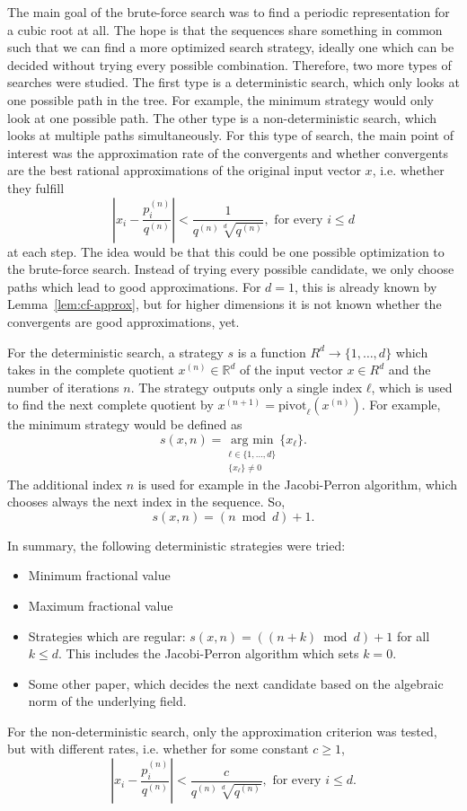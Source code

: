 The main goal of the brute-force search was to find a periodic representation for a cubic root at all.
The hope is that the sequences share something in common such that we can find
a more optimized search strategy, ideally one which can be decided without
trying every possible combination.
Therefore, two more types of searches were studied.
The first type is a deterministic search,
which only looks at one possible path in the tree.
For example, the minimum strategy would only look at one possible path.
The other type is a non-deterministic search,
which looks at multiple paths simultaneously.
For this type of search, the main point of interest was the approximation rate of the convergents
and whether convergents are the best rational approximations of the original input vector $x$,
i.e. whether they fulfill
\[
  |x_i - \frac{p_i^{(n)}}{q^{(n)}}| < \frac{1}{q^{(n)} \sqrt[d]{q^{(n)}}}, \text{ for every } i ≤ d
\]
at each step.
The idea would be that this could be one possible optimization to the brute-force search.
Instead of trying every possible candidate, we only choose paths which lead to good approximations.
For $d = 1$, this is already known by Lemma~\ref{lem:cf-approx},
but for higher dimensions it is not known whether the convergents are good
approximations, yet.

For the deterministic search, a strategy $s$ is a function $R^d → \{1, …, d\}$
which takes in the complete quotient $x^{(n)} ∈ ℝ^d$ of the input vector $x ∈ R^d$
and the number of iterations $n$.
The strategy outputs only a single index $ℓ$,
which is used to find the next complete quotient by $x^{(n+1)} =
\mathrm{pivot}_ℓ(x^{(n)})$.
For example, the minimum strategy would be defined as
\[
  s(x, n) = \underset{\substack{ℓ ∈ \{1, …, d\} \\ \{x_ℓ\} ≠ 0}}{\text{arg min}} \{x_ℓ\}.
\]
The additional index $n$ is used for example in the Jacobi-Perron algorithm,
which chooses always the next index in the sequence.
So,
\[
  s(x, n) = (n \bmod d) + 1.
\]

In summary, the following deterministic strategies were tried:
\begin{itemize}
  \item Minimum fractional value
  \item Maximum fractional value
  \item Strategies which are regular: $s(x, n) = ((n + k) \bmod d) + 1$ for all $k ≤ d$.
    This includes the Jacobi-Perron algorithm which sets $k = 0$.
  \item Some other paper, which decides the next candidate
    based on the algebraic norm of the underlying field. %
\end{itemize}

For the non-deterministic search, only the approximation criterion was tested,
but with different rates, i.e. whether for some constant $c ≥ 1$,
\[
  |x_i - \frac{p_i^{(n)}}{q^{(n)}}| < \frac{c}{q^{(n)} \sqrt[d]{q^{(n)}}}, \text{ for every } i ≤ d.
\]

